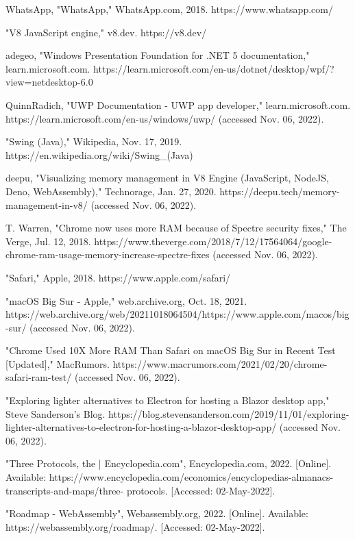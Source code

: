 \begin{thebibliography}{9}
WhatsApp, "WhatsApp," WhatsApp.com, 2018. https://www.whatsapp.com/

"V8 JavaScript engine," v8.dev. https://v8.dev/

adegeo, "Windows Presentation Foundation for .NET 5 documentation," learn.microsoft.com. https://learn.microsoft.com/en-us/dotnet/desktop/wpf/?view=netdesktop-6.0

QuinnRadich, "UWP Documentation - UWP app developer," learn.microsoft.com. https://learn.microsoft.com/en-us/windows/uwp/ (accessed Nov. 06, 2022).

"Swing (Java)," Wikipedia, Nov. 17, 2019. https://en.wikipedia.org/wiki/Swing\_(Java)

deepu, "Visualizing memory management in V8 Engine (JavaScript, NodeJS, Deno, WebAssembly)," Technorage, Jan. 27, 2020. https://deepu.tech/memory-management-in-v8/ (accessed Nov. 06, 2022).

T. Warren, "Chrome now uses more RAM because of Spectre security fixes," The Verge, Jul. 12, 2018. https://www.theverge.com/2018/7/12/17564064/google-chrome-ram-usage-memory-increase-spectre-fixes (accessed Nov. 06, 2022).

"Safari," Apple, 2018. https://www.apple.com/safari/

"macOS Big Sur - Apple," web.archive.org, Oct. 18, 2021. https://web.archive.org/web/20211018064504/https://www.apple.com/macos/big-sur/ (accessed Nov. 06, 2022).

"Chrome Used 10X More RAM Than Safari on macOS Big Sur in Recent Test [Updated]," MacRumors. https://www.macrumors.com/2021/02/20/chrome-safari-ram-test/ (accessed Nov. 06, 2022).

"Exploring lighter alternatives to Electron for hosting a Blazor desktop app," Steve Sanderson’s Blog. https://blog.stevensanderson.com/2019/11/01/exploring-lighter-alternatives-to-electron-for-hosting-a-blazor-desktop-app/ (accessed Nov. 06, 2022).

"Three Protocols, the | Encyclopedia.com", Encyclopedia.com, 2022. [Online]. Available: https://www.encyclopedia.com/economics/encyclopedias-almanacs-transcripts-and-maps/three- protocols. [Accessed: 02-May-2022].

"Roadmap - WebAssembly", Webassembly.org, 2022. [Online]. Available: https://webassembly.org/roadmap/. [Accessed: 02-May-2022].


\end{thebibliography}

